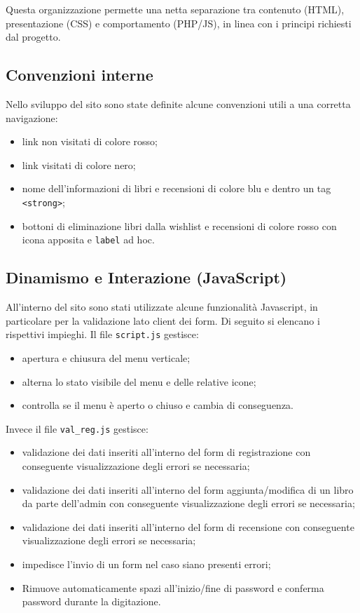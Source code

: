 \documentclass{article}
\begin{document}
\medskip

Questa organizzazione permette una netta separazione tra contenuto (HTML), presentazione (CSS) e comportamento (PHP/JS), in linea con i principi richiesti dal progetto.

\subsection{Convenzioni interne}
Nello sviluppo del sito sono state definite alcune convenzioni utili a una corretta navigazione:
\begin{itemize}
    \item link non visitati di colore rosso;
    \item link visitati di colore nero;
    \item nome dell'informazioni di libri e recensioni di colore blu e dentro un tag \texttt{<strong>};
    \item bottoni di eliminazione libri dalla wishlist e recensioni di colore rosso con icona apposita e \texttt{label} ad hoc.
\end{itemize}




\subsection{Dinamismo e Interazione (JavaScript)}
All'interno del sito sono stati utilizzate alcune funzionalità Javascript, in particolare per la validazione lato client dei form. Di seguito si elencano i rispettivi impieghi.
Il file \texttt{script.js} gestisce:
\begin{itemize}
    \item apertura e chiusura del menu verticale;
    \item alterna lo stato visibile del menu e delle relative icone;
    \item controlla se il menu è aperto o chiuso e cambia di conseguenza.
\end{itemize}

Invece il file \texttt{val\_reg.js} gestisce:

\begin{itemize}
    \item validazione dei dati inseriti all'interno del form di registrazione con conseguente visualizzazione degli errori se necessaria;
    \item validazione dei dati inseriti all'interno del form aggiunta/modifica di un libro da parte dell'admin con conseguente visualizzazione degli errori se necessaria;
    \item validazione dei dati inseriti all'interno del form di recensione con conseguente visualizzazione degli errori se necessaria;
    \item impedisce l'invio di un form nel caso siano presenti errori;
    \item Rimuove automaticamente spazi all'inizio/fine di password e conferma password durante la digitazione.
\end{itemize}
\end{document}
